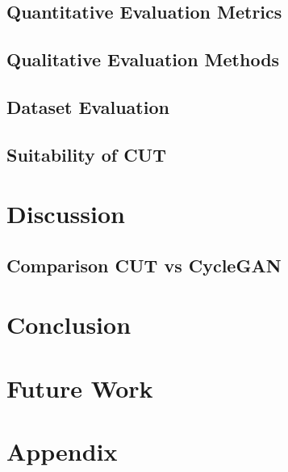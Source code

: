 \documentclass[a4paper,11pt, DIV=12]{scrartcl}
\begin{document}
\subsection{Quantitative Evaluation Metrics}
\subsection{Qualitative Evaluation Methods}
\subsection{Dataset Evaluation}
\subsection{Suitability of CUT}

\section{Discussion}
\subsection{Comparison CUT vs CycleGAN}

\section{Conclusion}
\section{Future Work}
\section{Appendix}

\printbibliography
\end{document}
